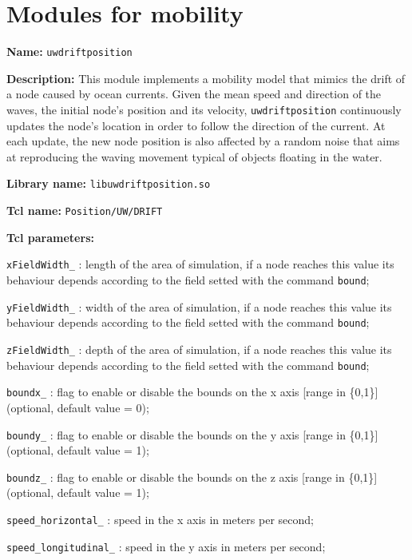 \section{Modules for mobility}\label{sec:mobility}

\begin{description}
   \item {\bf Name:} {\tt uwdriftposition}  
   \item {\bf Description:}  This module implements a mobility model that mimics the drift of a node caused by ocean currents. Given the   mean speed and direction of the waves, the initial node's position and its velocity, {\tt uwdriftposition} continuously updates the node's location in order to follow the direction of the current. At each update, the new node position is also affected by a random noise that aims at reproducing the waving movement typical of objects floating in the water.
   \item {\bf Library name:} {\tt libuwdriftposition.so}
   \item {\bf Tcl name:} {\tt Position/UW/DRIFT}
   \item {\bf Tcl parameters:}
   \begin{description}
    \item {\tt xFieldWidth\_} : length of the area of simulation, if a node reaches this value its behaviour depends according to the field setted with the command {\tt bound};
    \item {\tt yFieldWidth\_} : width of the area of simulation, if a node reaches this value its behaviour depends according to the field setted with the command {\tt bound};
    \item {\tt zFieldWidth\_} : depth of the area of simulation, if a node reaches this value its behaviour depends according to the field setted with the command {\tt bound};
    \item {\tt boundx\_} : flag to enable or disable the bounds on the x axis [range in \{0,1\}] (optional, default value = 0);
    \item {\tt boundy\_} : flag to enable or disable the bounds on the y axis [range in \{0,1\}] (optional, default value = 1);
    \item {\tt boundz\_} : flag to enable or disable the bounds on the z axis [range in \{0,1\}] (optional, default value = 1);
    \item {\tt speed\_horizontal\_} : speed in the x axis in meters per second;
    \item {\tt speed\_longitudinal\_} : speed in the y axis in meters per second;

\end{description}
\end{description}
